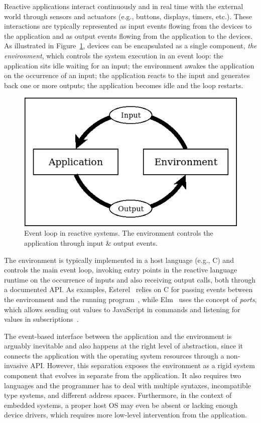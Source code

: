 \documentclass[sigplan,10pt,review,anonymous]{acmart}\settopmatter{printfolios=true,printccs=false,printacmref=false}
\begin{document}
Reactive applications interact continuously and in real time with the external
world through sensors and actuators (e.g., buttons, displays, timers, etc.).
%
These interactions are typically represented as input events flowing from the
devices to the application and as output events flowing from the application to
the devices.
%
As illustrated in Figure~\ref{fig.env}, devices can be encapsulated as a
single component, \emph{the environment}, which controls the system execution
in an event loop:
the application sits idle waiting for an input;
the environment awakes the application on the occurrence of an input;
the application reacts to the input and generates back one or more outputs;
the application becomes idle and the loop restarts.

\begin{figure}
\centering
\includegraphics[width=\linewidth]{loop}
\caption{ Event loop in reactive systems.
          The environment controls the application through input \& output
          events.
\label{fig.env}
}
\end{figure}

The environment is typically implemented in a host language (e.g., C) and
controls the main event loop, invoking entry points in the reactive language
runtime on the occurrence of inputs and also receiving output calls, both
through a documented API.
%
As examples, Esterel~\cite{esterel.ieee91} relies on C for passing events
between the environment and the running program~\cite{esterel.book.compiling},
while Elm~\cite{frp.elm} uses the concept of \emph{ports}, which allows sending
out values to JavaScript in commands and listening for values in
subscriptions~\cite{frp.elm.ports}.

The event-based interface between the application and the environment is
arguably inevitable and also happens at the right level of abstraction, since
it connects the application with the operating system resources through a
non-invasive API.
%
However, this separation exposes the environment as a rigid system component
that evolves in separate from the application.
%
It also requires two languages and the programmer has to deal with multiple
syntaxes, incompatible type systems, and different address spaces.
%
Furthermore, in the context of embedded systems, a proper host OS may even be
absent or lacking enough device drivers, which requires more low-level
intervention from the application.
\end{document}
